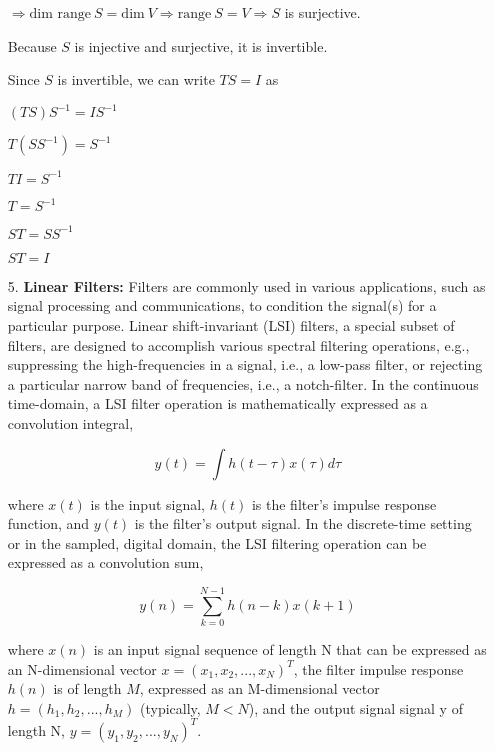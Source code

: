 \documentclass[fleqn]{article}
\begin{document}
\begin{enumerate}[nolistsep]
	$\Rightarrow \text{dim range}\ S = \text{dim}\ V \Rightarrow \text{range}\ S = V \Rightarrow S$ is surjective.
	
	Because $S$ is injective and surjective, it is invertible.
	
	Since $S$ is invertible, we can write $TS = I$ as
	
	$(TS)S^{-1} = IS^{-1}$
	
	$T(SS^{-1}) = S^{-1}$
	
	$TI = S^{-1}$
	
	$T = S^{-1}$
	
	$ST = SS^{-1}$
	
	$ST = I$
	
	\item[5.] \textbf{Linear Filters:} Filters are commonly used in various applications, such as signal processing and communications, to condition the signal(s) for a particular purpose. Linear shift-invariant (LSI) filters, a special subset of filters, are designed to accomplish various spectral filtering operations, e.g., suppressing the high-frequencies in a signal, i.e., a low-pass filter, or rejecting a particular narrow band of frequencies, i.e., a notch-filter. In the continuous time-domain, a LSI filter operation is mathematically expressed as a convolution integral,
	
		\begin{equation}
			y(t) = \int{h(t-\tau)x(\tau)d\tau}
		\end{equation}
		
		where $x(t)$ is the input signal, $h(t)$ is the filter’s impulse response function, and $y(t)$ is the filter’s output signal. In the discrete-time setting or in the sampled, digital domain, the LSI filtering operation can be expressed as a convolution sum,
	
		\begin{equation}
			y(n) = \sum_{k=0}^{N-1}{h(n-k)x(k+1)}
			\label{dt_convolution}
		\end{equation}
		
	
		where $x(n)$ is an input signal sequence of length N that can be expressed as an N-dimensional vector $x = (x_1, x_2, ..., x_N)^T$, the filter impulse response $h(n)$ is of length $M$, expressed as an M-dimensional vector $h = (h_1, h_2, ..., h_M)$ (typically, $M < N$), and the output signal signal y of length N, $y = (y_1, y_2, ..., y_N)^T$.
		

\end{enumerate}
\end{document}
